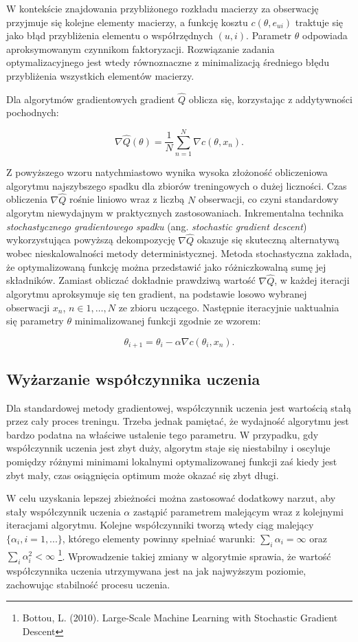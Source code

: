 \documentclass{pracamgr}
\begin{document}
W kontekście znajdowania przybliżonego rozkładu macierzy za obserwację przyjmuje się kolejne elementy macierzy,  a funkcję kosztu $c(\theta, e_{ui})$ traktuje się jako błąd przybliżenia elementu o współrzędnych $(u, i)$. Parametr $\theta$ odpowiada aproksymowanym czynnikom faktoryzacji. Rozwiązanie zadania optymalizacyjnego jest wtedy równoznaczne z minimalizacją średniego błędu przybliżenia wszystkich elementów macierzy.

Dla algorytmów gradientowych gradient $\hat{Q}$ oblicza się, korzystając z addytywności pochodnych:

\[
\nabla \hat{Q}(\theta) = \frac{1}{N} \sum_{n = 1}^{N} \nabla c(\theta, x_n).
\]

Z powyższego wzoru natychmiastowo wynika wysoka złożoność obliczeniowa algorytmu najszybszego spadku dla zbiorów treningowych o dużej liczności. Czas obliczenia $\nabla \hat{Q}$ rośnie liniowo wraz z liczbą $N$ obserwacji, co czyni standardowy algorytm niewydajnym w praktycznych zastosowaniach. Inkrementalna technika \textit{stochastycznego gradientowego spadku} (ang. \textit{stochastic gradient descent}) wykorzystująca powyższą dekompozycję $\nabla \hat{Q}$ okazuje się skuteczną alternatywą wobec nieskalowalności metody deterministycznej. Metoda stochastyczna zakłada, że optymalizowaną funkcję można przedstawić jako różniczkowalną sumę jej składników. Zamiast obliczać dokładnie prawdziwą wartość $\nabla \hat{Q}$, w każdej iteracji algorytmu aproksymuje się ten gradient, na podstawie losowo wybranej obserwacji $x_n$, $n \in {1, \ldots, N}$ ze zbioru uczącego. Następnie iteracyjnie uaktualnia się parametry $\theta$ minimalizowanej funkcji zgodnie ze wzorem:

\[
\theta_{i+1} = \theta_{i} - \alpha \nabla c(\theta_{i}, x_n).
\]

\subsection{Wyżarzanie współczynnika uczenia}
Dla standardowej metody gradientowej, współczynnik uczenia jest wartością stałą przez cały proces treningu. Trzeba jednak pamiętać, że wydajność algorytmu jest bardzo podatna na właściwe ustalenie tego parametru. W przypadku, gdy współczynnik uczenia jest zbyt duży, algorytm staje się niestabilny i oscyluje pomiędzy różnymi minimami lokalnymi optymalizowanej funkcji zaś kiedy jest zbyt mały, czas osiągnięcia optimum może okazać się zbyt długi.

W celu uzyskania lepszej zbieżności można zastosować dodatkowy narzut, aby stały współczynnik uczenia $\alpha$ zastąpić parametrem malejącym wraz z kolejnymi iteracjami algorytmu. Kolejne współczynniki tworzą wtedy ciąg malejący $\{ \alpha_i, i = 1, ... \}$, którego elementy powinny spełniać warunki: $\sum_{i} \alpha_{i} = \infty$ oraz $\sum_{i} \alpha_{i}^2 < \infty$ \footnote{Bottou, L. (2010). Large-Scale Machine Learning with Stochastic Gradient Descent}. Wprowadzenie takiej zmiany w algorytmie sprawia, że wartość współczynnika uczenia utrzymywana jest na jak najwyższym poziomie, zachowując stabilność procesu uczenia. 
\end{document}
